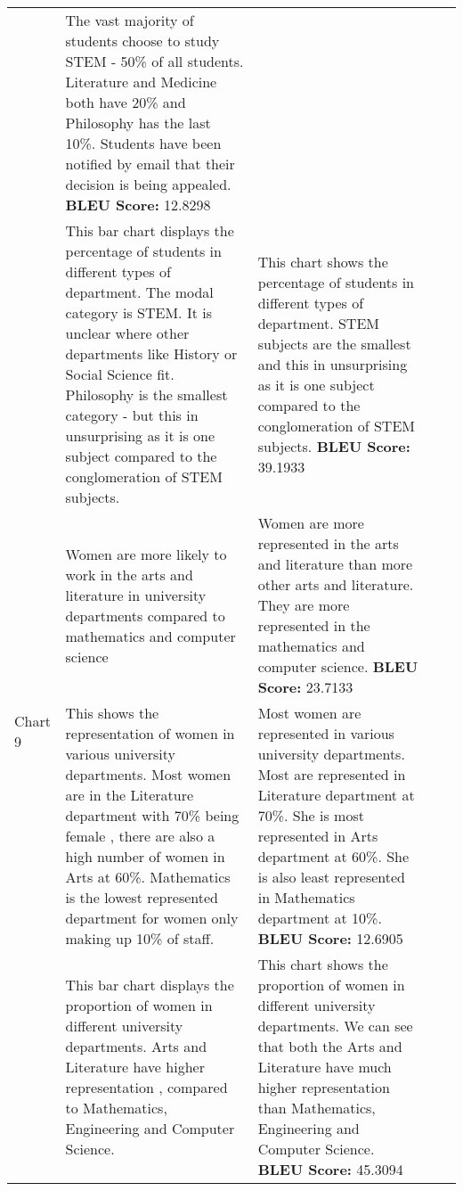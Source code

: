 \documentclass[]{article}
\begin{document}
\begin{landscape}
\begin{longtable}{|p{13mm}|p{57mm}|p{57mm}|p{57mm}|p{57mm}|}
 & The vast majority of students choose to study STEM - 50\% of all students. Literature and Medicine both have 20\% and Philosophy has the last 10\%. Students have been notified by email that their decision is being appealed.
\newline \textbf{BLEU Score: }12.8298\\ \cline{2-5}&This bar chart displays the percentage of students in different types of department. The modal category is STEM. It is unclear where other departments like History or Social Science fit. Philosophy is the smallest category - but this in unsurprising as it is one subject compared to the conglomeration of STEM subjects. 
 & This chart shows the percentage of students in different types of department. STEM subjects are the smallest and this in unsurprising as it is one subject compared to the conglomeration of STEM subjects.
\newline \textbf{BLEU Score: }39.1933\\ \cline{2-5}\hline\multirow{2}{*}{Chart 9}&Women are more likely to work in the arts and literature in university departments compared to mathematics and computer science 
 & Women are more represented in the arts and literature than more other arts and literature. They are more represented in the mathematics and computer science.
\newline \textbf{BLEU Score: }23.7133\\ \cline{2-5}&This shows the representation of women in various university departments. Most women are in the Literature department with 70\% being female , there are also a high number of women in Arts at 60\%. Mathematics is the lowest represented department for women only making up 10\% of staff. 
 & Most women are represented in various university departments. Most are represented in Literature department at 70\%. She is most represented in Arts department at 60\%. She is also least represented in Mathematics department at 10\%.
\newline \textbf{BLEU Score: }12.6905\\ \cline{2-5}&This bar chart displays the proportion of women in different university departments. Arts and Literature have higher representation , compared to Mathematics, Engineering and Computer Science.  & This chart shows the proportion of women in different university departments. We can see that both the Arts and Literature have much higher representation than Mathematics, Engineering and Computer Science.
\newline \textbf{BLEU Score: }45.3094\\ \cline{2-5}\hline \end{longtable}
    \end{landscape}
    
\end{document}
